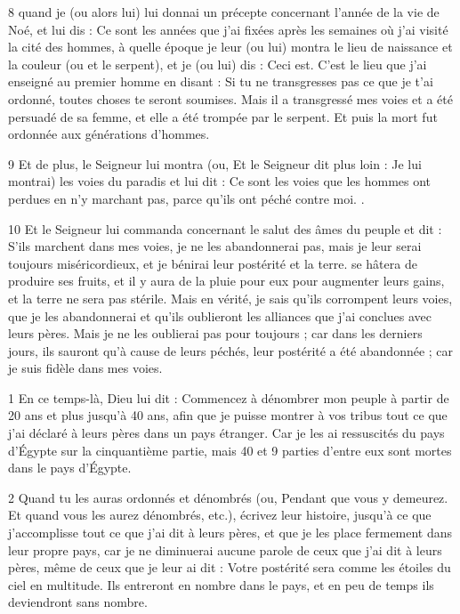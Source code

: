 \par 8 quand je (ou alors lui) lui donnai un précepte concernant l'année de la vie de Noé, et lui dis : Ce sont les années que j'ai fixées après les semaines où j'ai visité la cité des hommes, à quelle époque je leur (ou lui) montra le lieu de naissance et la couleur (ou et le serpent), et je (ou lui) dis : Ceci est. C'est le lieu que j'ai enseigné au premier homme en disant : Si tu ne transgresses pas ce que je t'ai ordonné, toutes choses te seront soumises. Mais il a transgressé mes voies et a été persuadé de sa femme, et elle a été trompée par le serpent. Et puis la mort fut ordonnée aux générations d’hommes.

\par 9 Et de plus, le Seigneur lui montra (ou, Et le Seigneur dit plus loin : Je lui montrai) les voies du paradis et lui dit : Ce sont les voies que les hommes ont perdues en n'y marchant pas, parce qu'ils ont péché contre moi. .

\par 10 Et le Seigneur lui commanda concernant le salut des âmes du peuple et dit : S'ils marchent dans mes voies, je ne les abandonnerai pas, mais je leur serai toujours miséricordieux, et je bénirai leur postérité et la terre. se hâtera de produire ses fruits, et il y aura de la pluie pour eux pour augmenter leurs gains, et la terre ne sera pas stérile. Mais en vérité, je sais qu'ils corrompent leurs voies, que je les abandonnerai et qu'ils oublieront les alliances que j'ai conclues avec leurs pères. Mais je ne les oublierai pas pour toujours ; car dans les derniers jours, ils sauront qu'à cause de leurs péchés, leur postérité a été abandonnée ; car je suis fidèle dans mes voies.


\par 1 En ce temps-là, Dieu lui dit : Commencez à dénombrer mon peuple à partir de 20 ans et plus jusqu'à 40 ans, afin que je puisse montrer à vos tribus tout ce que j'ai déclaré à leurs pères dans un pays étranger. Car je les ai ressuscités du pays d'Égypte sur la cinquantième partie, mais 40 et 9 parties d'entre eux sont mortes dans le pays d'Égypte.

\par 2 Quand tu les auras ordonnés et dénombrés (ou, Pendant que vous y demeurez. Et quand vous les aurez dénombrés, etc.), écrivez leur histoire, jusqu'à ce que j'accomplisse tout ce que j'ai dit à leurs pères, et que je les place fermement dans leur propre pays, car je ne diminuerai aucune parole de ceux que j'ai dit à leurs pères, même de ceux que je leur ai dit : Votre postérité sera comme les étoiles du ciel en multitude. Ils entreront en nombre dans le pays, et en peu de temps ils deviendront sans nombre.

